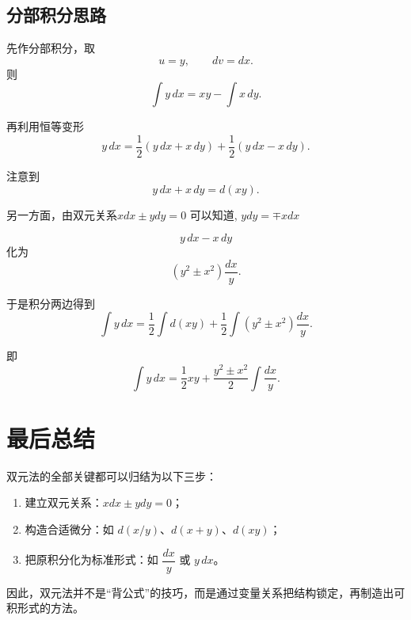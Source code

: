 \documentclass[UTF8,a4paper,12pt]{ctexart}
\begin{document}
\subsection{分部积分思路}

先作分部积分，取
\[
  u=y,\qquad dv=dx.
\]
则
\[
  \int y\,dx=xy-\int x\,dy.
\]

再利用恒等变形
\[
  y\,dx=\frac{1}{2}(y\,dx+x\,dy)+\frac{1}{2}(y\,dx-x\,dy).
\]

注意到
\[
  y\,dx+x\,dy=d(xy).
\]

另一方面，由双元关系$xdx \pm ydy = 0$ 可以知道,
$ydy = \mp xdx$

\[
  y\,dx-x\,dy
\]
化为
\[
  \left(y^2\pm x^2\right)\frac{dx}{y}.
\]

于是积分两边得到
\[
  \int y\,dx
  =\frac{1}{2}\int d(xy)+\frac{1}{2}\int \left(y^2\pm x^2\right)\frac{dx}{y}.
\]

即
\[
  \int y\,dx
  =\frac{1}{2}xy+\frac{y^2\pm x^2}{2}\int \frac{dx}{y}.
\]

\section{最后总结}

双元法的全部关键都可以归结为以下三步：
\begin{enumerate}
  \item 建立双元关系：$xdx\pm ydy=0$；
  \item 构造合适微分：如 $d(x/y)$、$d(x+y)$、$d(xy)$；
  \item 把原积分化为标准形式：如 $\dfrac{dx}{y}$ 或 $y\,dx$。
\end{enumerate}

因此，双元法并不是“背公式”的技巧，而是通过变量关系把结构锁定，再制造出可积形式的方法。
\end{document}
